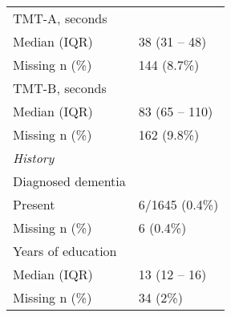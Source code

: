 \begin{table}
\begin{longtable}{ll}
TMT-A, seconds &  \\ 
\quad Median (IQR) & 38 (31 -- 48) \\ 
\quad Missing n (\%) & 144 (8.7\%) \\ 
TMT-B, seconds &  \\ 
\quad Median (IQR) & 83 (65 -- 110) \\ 
\quad Missing n (\%) & 162 (9.8\%) \\ 
\rule{0pt}{3ex}    
\emph{History}\\
\hline
Diagnosed dementia & \\
\quad Present & 6/1645 (0.4\%)\\
\quad Missing n (\%) & 6 (0.4\%) \\
Years of education &  \\ 
\quad Median (IQR) & 13 (12 -- 16) \\ 
\quad Missing n (\%) & 34 (2\%) \\ 
\bottomrule
\end{longtable}
\label{tab:democog}
\end{table}
